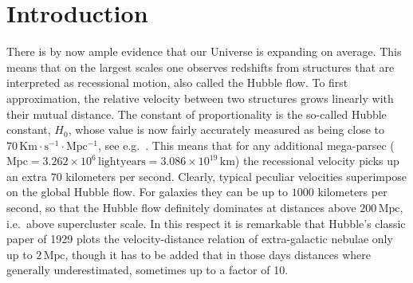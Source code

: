 \documentclass
[rmp,aps,twocolumn,showpacs,preprintnumbers,amsmath,amssymb]{revtex4}
\theoremstyle{plain}
\theoremstyle{definition}
\theoremstyle{remark}
\begin{document}

\maketitle

\tableofcontents





\section{Introduction}
\label{sec:Introduction}
%
There is by now ample evidence that our Universe is expanding on average. 
This means that on the largest scales one observes redshifts from 
structures that are interpreted as recessional motion, also called the 
Hubble flow. To first approximation, the relative velocity between two 
structures grows linearly with their mutual distance. The constant of 
proportionality is the so-called Hubble constant, $H_0$, whose value is 
now fairly accurately measured as being close to 
$70\,\mathrm{Km\cdot s^{-1}\cdot Mpc^{-1}}$, see e.g.~\cite{Komatsu.etal:2008}. 
This means that for any additional mega-parsec 
($\mathrm{Mpc}=3.262\times10^6\,\mathrm{lightyears}=
3.086\times 10^{19}\,\mathrm{km}$) the recessional velocity picks up an 
extra $70$ kilometers per second. Clearly, typical peculiar velocities 
superimpose on the global Hubble flow. For galaxies they can be up to 
$1000$ kilometers per second, so that the Hubble flow definitely dominates 
at distances above $200\,\mathrm{Mpc}$, i.e.~above supercluster scale. In 
this respect it is remarkable that Hubble's classic paper \cite{Hubble:1929} 
of 1929 plots the velocity-distance relation of extra-galactic nebulae only 
up to $2\,\mathrm{Mpc}$, though it has to be added that in those days 
distances where generally underestimated, sometimes up to a factor of 10. 
\end{document}
